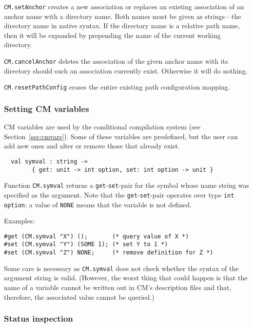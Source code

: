\documentclass{article}
\begin{document}
{\tt CM.setAnchor} creates a new association or replaces an existing
association of an anchor name with a directory name.  Both names must
be given as strings---the directory name in native syntax.  If the
directory name is a relative path name, then it will be expanded by
prepending the name of the current working directory.

{\tt CM.cancelAnchor} deletes the association of the given anchor name
with its directory should such an association currently exist.
Otherwise it will do nothing.

{\tt CM.resetPathConfig} erases the entire existing path configuration
mapping.

\subsubsection*{Setting CM variables}

CM variables are used by the conditional compilation system (see
Section~\ref{sec:cmvars}).   Some of these variables are predefined,
but the user can add new ones and alter or remove those that already
exist.

\begin{verbatim}
  val symval : string ->
        { get: unit -> int option, set: int option -> unit }
\end{verbatim}

Function {\tt CM.symval} returns a {\tt get}-{\tt set}-pair for the
symbol whose name string was specified as the argument.  Note that the
{\tt get}-{\tt set}-pair operates over type {\tt int option}; a value
of {\tt NONE} means that the variable is not defined.

\noindent Examples:
\begin{verbatim}
#get (CM.symval "X") ();       (* query value of X *)
#set (CM.symval "Y") (SOME 1); (* set Y to 1 *)
#set (CM.symval "Z") NONE;     (* remove definition for Z *)
\end{verbatim}

Some care is necessary as {\tt CM.symval} does not check whether the
syntax of the argument string is valid.  (However, the worst thing
that could happen is that the name of a variable cannot be written out
in CM's description files and that, therefore, the associated value
cannot be queried.)

\subsubsection*{Status inspection}
\end{document}
